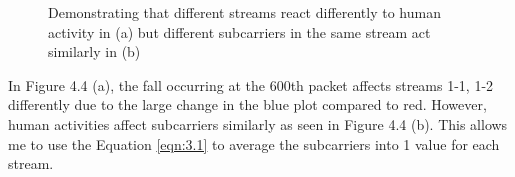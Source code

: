 \begin{figure}[H]%
    \centering
    \qquad
    \caption{Demonstrating that different streams react differently to human activity in (a) but different subcarriers in the same stream act similarly in (b)}%
    \label{fig:subcarriersVSstreams}%
\end{figure}
In Figure 4.4 (a), the fall occurring at the 600th packet affects streams 1-1, 1-2 differently due to the large change in the blue plot compared to red. However, human activities affect subcarriers similarly as seen in Figure 4.4 (b). This allows me to use the Equation \ref{eqn:3.1} to average the subcarriers into 1 value for each stream. 
